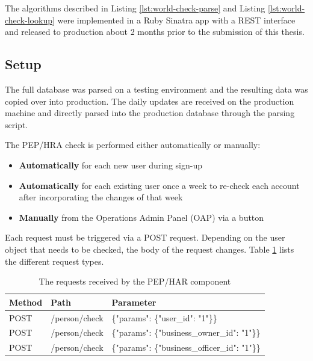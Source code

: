 \documentclass[a4paper, oneside]{csthesis}
\begin{document}
The algorithms described in Listing \ref{lst:world-check-parse} and Listing \ref{lst:world-check-lookup} were implemented in a Ruby Sinatra app with a REST interface and released to production about 2 months prior to the submission of this thesis.

\subsection{Setup}

The full database was parsed on a testing environment and the resulting data was copied over into production. The daily updates are received on the production machine and directly parsed into the production database through the parsing script.

The PEP/HRA check is performed either automatically or manually:
\begin{itemize}
\item \textbf{Automatically} for each new user during sign-up
\item \textbf{Automatically} for each existing user once a week to re-check each account after incorporating the changes of that week
\item \textbf{Manually} from the Operations Admin Panel (OAP) via a button
\end{itemize}

Each request must be triggered via a POST request. Depending on the user object that needs to be checked, the body of the request changes. Table \ref{tbl:har-pep-requests} lists the different request types.

\begin{table}[tb]
    \begin{center}
        \begin{tabular}{p{1.75cm}|p{3cm}p{7cm}}
        \hline
        \textbf{Method} & \textbf{Path} & \textbf{Parameter} \\
        \hline
        POST & /person/check & \{"params": \{"user\_id": "1"\}\} \\ \hdashline[0.5pt/3pt]
        POST & /person/check & \{"params": \{"business\_owner\_id": "1"\}\} \\ \hdashline[0.5pt/3pt]
        POST & /person/check & \{"params": \{"business\_officer\_id": "1"\}\} \\
        \hline
        \end{tabular}
    \end{center}
    \label{tbl:har-pep-requests}
    \caption{The requests received by the PEP/HAR component}
\end{table}
\end{document}
